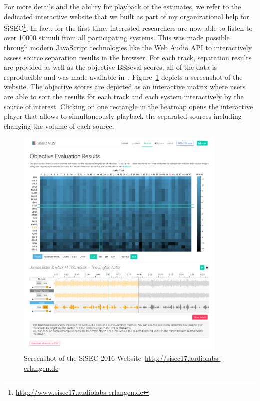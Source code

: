 For more details and the ability for playback of the estimates, we refer to the dedicated interactive website that we built as part of my organizational help for SiSEC\footnote{\url{http://www.sisec17.audiolabs-erlangen.de}}.
In fact, for the first time, interested researchers are now able to listen to over 10000 stimuli from all participating systems.
This was made possible through modern JavaScript technologies like the Web Audio API to interactively assess source separation results in the browser.
For each track, separation results are provided as well as the objective BSSeval scores, all of the data is reproducible and was made available in~\cite{oss_sisecwebsite}.
Figure~\ref{fig:sisec_website} depicts a screenshot of the website.
The objective scores are depicted as an interactive matrix where users are able to sort the results for each track and each system interactively by the source of interest.
Clicking on one rectangle in the heatmap opens the interactive player that allows to simultaneously playback the separated sources including changing the volume of each source.

\begin{figure}[!h]
\centering
\includegraphics[width=0.9\textwidth]{Chapters/06_Separation_Unknown/figures/sisec_website.png}
\caption{Screenshot of the SiSEC 2016 Website~\url{http://sisec17.audiolabs-erlangen.de}}
\label{fig:sisec_website}

\end{figure}

